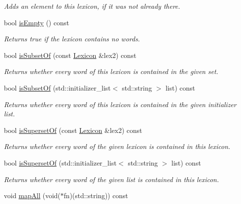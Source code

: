 \begin{DoxyCompactItemize}
\begin{DoxyCompactList}\small\item\em Adds an element to this lexicon, if it was not already there. \end{DoxyCompactList}\item 
bool \mbox{\hyperlink{classLexicon_acf82f9b2937375c7b1cf3dccb3df3312}{is\+Empty}} () const
\begin{DoxyCompactList}\small\item\em Returns {\ttfamily true} if the lexicon contains no words. \end{DoxyCompactList}\item 
bool \mbox{\hyperlink{classLexicon_a6c118f41dad8941a624c3ff479987e3d}{is\+Subset\+Of}} (const \mbox{\hyperlink{classLexicon}{Lexicon}} \&lex2) const
\begin{DoxyCompactList}\small\item\em Returns whether every word of this lexicon is contained in the given set. \end{DoxyCompactList}\item 
bool \mbox{\hyperlink{classLexicon_a2a0f1241b53bcf0b31103b79cb01b87d}{is\+Subset\+Of}} (std\+::initializer\+\_\+list$<$ std\+::string $>$ list) const
\begin{DoxyCompactList}\small\item\em Returns whether every word of this lexicon is contained in the given initializer list. \end{DoxyCompactList}\item 
bool \mbox{\hyperlink{classLexicon_ad6a4796a72905df1e33f4b100cb91f32}{is\+Superset\+Of}} (const \mbox{\hyperlink{classLexicon}{Lexicon}} \&lex2) const
\begin{DoxyCompactList}\small\item\em Returns whether every word of the given lexicon is contained in this lexicon. \end{DoxyCompactList}\item 
bool \mbox{\hyperlink{classLexicon_a217cbc1e6ba9f694645608c8a17c1943}{is\+Superset\+Of}} (std\+::initializer\+\_\+list$<$ std\+::string $>$ list) const
\begin{DoxyCompactList}\small\item\em Returns whether every word of the given list is contained in this lexicon. \end{DoxyCompactList}\item 
void \mbox{\hyperlink{classLexicon_a2e4e14ffb291ba4d5475b9b66d2a12c8}{map\+All}} (void($\ast$fn)(std\+::string)) const

\end{DoxyCompactItemize}
